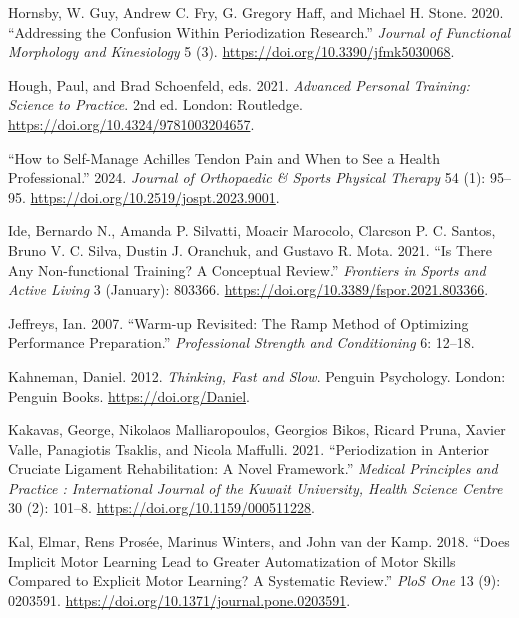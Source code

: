 \documentclass[
  letterpaper,
  DIV=11,
  numbers=noendperiod]{scrreprt}
\newlength{\cslhangindent}
\newenvironment{CSLReferences}[2] %
 {\begin{list}{}{%
  \setlength{\itemindent}{0pt}
  \setlength{\leftmargin}{0pt}
  \setlength{\parsep}{0pt}
  \ifodd #1
   \setlength{\leftmargin}{\cslhangindent}
   \setlength{\itemindent}{-1\cslhangindent}
  \fi
  \setlength{\itemsep}{#2\baselineskip}}}
 {\end{list}}
\begin{document}
\begin{CSLReferences}{1}{0}
Hornsby, W. Guy, Andrew C. Fry, G. Gregory Haff, and Michael H. Stone.
2020. {``Addressing the {Confusion} Within {Periodization Research}.''}
\emph{Journal of Functional Morphology and Kinesiology} 5 (3).
\url{https://doi.org/10.3390/jfmk5030068}.

Hough, Paul, and Brad Schoenfeld, eds. 2021. \emph{Advanced {Personal
Training}: {Science} to {Practice}}. 2nd ed. London: Routledge.
\url{https://doi.org/10.4324/9781003204657}.

{``How to {Self-Manage Achilles Tendon Pain} and {When} to {See} a
{Health Professional}.''} 2024. \emph{Journal of Orthopaedic \& Sports
Physical Therapy} 54 (1): 95--95.
\url{https://doi.org/10.2519/jospt.2023.9001}.

Ide, Bernardo N., Amanda P. Silvatti, Moacir Marocolo, Clarcson P. C.
Santos, Bruno V. C. Silva, Dustin J. Oranchuk, and Gustavo R. Mota.
2021. {``Is {There Any Non-functional Training}? {A Conceptual
Review}.''} \emph{Frontiers in Sports and Active Living} 3 (January):
803366. \url{https://doi.org/10.3389/fspor.2021.803366}.

Jeffreys, Ian. 2007. {``Warm-up Revisited: {The} Ramp Method of
Optimizing Performance Preparation.''} \emph{Professional Strength and
Conditioning} 6: 12--18.

Kahneman, Daniel. 2012. \emph{Thinking, Fast and Slow}. Penguin
Psychology. London: Penguin Books. \url{https://doi.org/Daniel}.

Kakavas, George, Nikolaos Malliaropoulos, Georgios Bikos, Ricard Pruna,
Xavier Valle, Panagiotis Tsaklis, and Nicola Maffulli. 2021.
{``Periodization in {Anterior Cruciate Ligament Rehabilitation}: {A
Novel Framework}.''} \emph{Medical Principles and Practice :
International Journal of the Kuwait University, Health Science Centre}
30 (2): 101--8. \url{https://doi.org/10.1159/000511228}.

Kal, Elmar, Rens Prosée, Marinus Winters, and John van der Kamp. 2018.
{``Does Implicit Motor Learning Lead to Greater Automatization of Motor
Skills Compared to Explicit Motor Learning? {A} Systematic Review.''}
\emph{PloS One} 13 (9): 0203591.
\url{https://doi.org/10.1371/journal.pone.0203591}.


\end{CSLReferences}
\end{document}
